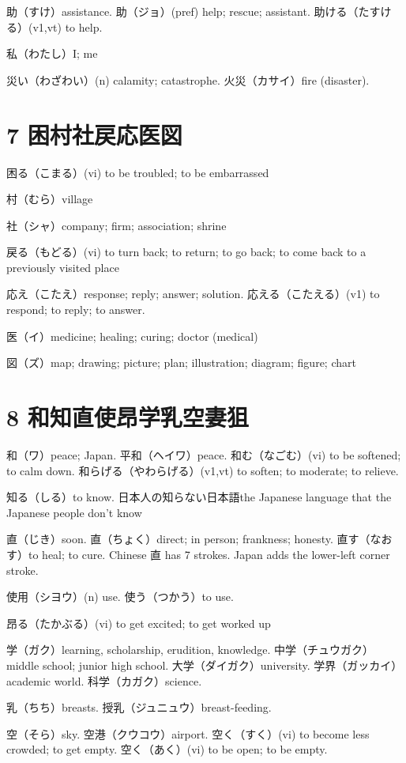 助（すけ）assistance.
助（ジョ）(pref) help; rescue; assistant.
助ける（たすける）(v1,vt) to help.

私（わたし）I; me

災い（わざわい）(n) calamity; catastrophe.
火災（カサイ）fire (disaster).

\section{7 困村社戻応医図}

困る（こまる）(vi) to be troubled; to be embarrassed

村（むら）village

社（シャ）company; firm; association; shrine

戻る（もどる）(vi) to turn back; to return; to go back;
to come back to a previously visited place

応え（こたえ）response; reply; answer; solution.
応える（こたえる）(v1) to respond; to reply; to answer.

医（イ）medicine; healing; curing; doctor (medical)

図（ズ）map; drawing; picture; plan; illustration; diagram; figure; chart

\section{8 和知直使昂学乳空妻狙}

和（ワ）peace; Japan.
平和（ヘイワ）peace.
和む（なごむ）(vi) to be softened; to calm down.
和らげる（やわらげる）(v1,vt) to soften; to moderate; to relieve.

知る（しる）to know.
日本人の知らない日本語the Japanese language that the Japanese people don't know

直（じき）soon.
直（ちょく）direct; in person; frankness; honesty.
直す（なおす）to heal; to cure.
Chinese 直 has 7 strokes.
Japan adds the lower-left corner stroke.

使用（シヨウ）(n) use.
使う（つかう）to use.

昂る（たかぶる）(vi) to get excited; to get worked up

学（ガク）learning, scholarship, erudition, knowledge.
中学（チュウガク）middle school; junior high school.
大学（ダイガク）university.
学界（ガッカイ）academic world.
科学（カガク）science.

乳（ちち）breasts.
授乳（ジュニュウ）breast-feeding.

空（そら）sky.
空港（クウコウ）airport.
空く（すく）(vi) to become less crowded; to get empty.
空く（あく）(vi) to be open; to be empty.

